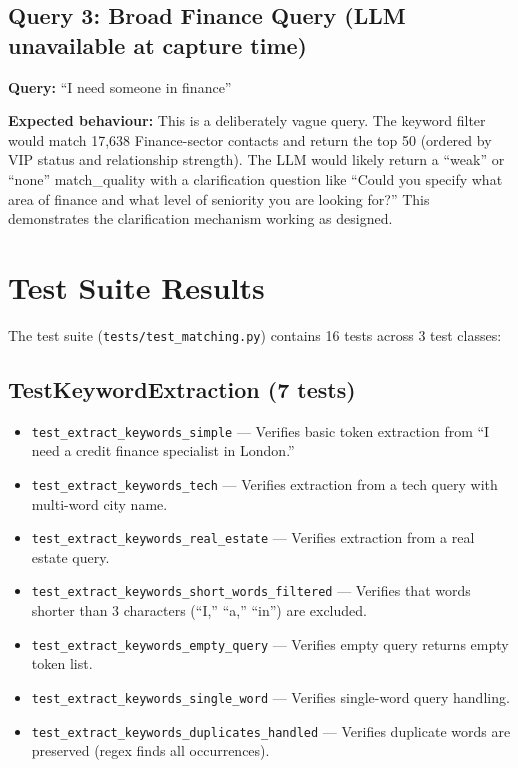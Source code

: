 \documentclass[12pt, a4paper]{report}
\begin{document}
\subsection{Query 3: Broad Finance Query (LLM unavailable at capture time)}

\textbf{Query:} ``I need someone in finance''

\textbf{Expected behaviour:} This is a deliberately vague query. The keyword filter would match 17,638 Finance-sector contacts and return the top 50 (ordered by VIP status and relationship strength). The LLM would likely return a ``weak'' or ``none'' match\_quality with a clarification question like ``Could you specify what area of finance and what level of seniority you are looking for?'' This demonstrates the clarification mechanism working as designed.

\section{Test Suite Results}

The test suite (\texttt{tests/test\_matching.py}) contains 16 tests across 3 test classes:

\subsection{TestKeywordExtraction (7 tests)}

\begin{itemize}[itemsep=2pt]
    \item \texttt{test\_extract\_keywords\_simple} --- Verifies basic token extraction from ``I need a credit finance specialist in London.''
    \item \texttt{test\_extract\_keywords\_tech} --- Verifies extraction from a tech query with multi-word city name.
    \item \texttt{test\_extract\_keywords\_real\_estate} --- Verifies extraction from a real estate query.
    \item \texttt{test\_extract\_keywords\_short\_words\_filtered} --- Verifies that words shorter than 3 characters (``I,'' ``a,'' ``in'') are excluded.
    \item \texttt{test\_extract\_keywords\_empty\_query} --- Verifies empty query returns empty token list.
    \item \texttt{test\_extract\_keywords\_single\_word} --- Verifies single-word query handling.
    \item \texttt{test\_extract\_keywords\_duplicates\_handled} --- Verifies duplicate words are preserved (regex finds all occurrences).
\end{itemize}
\end{document}
